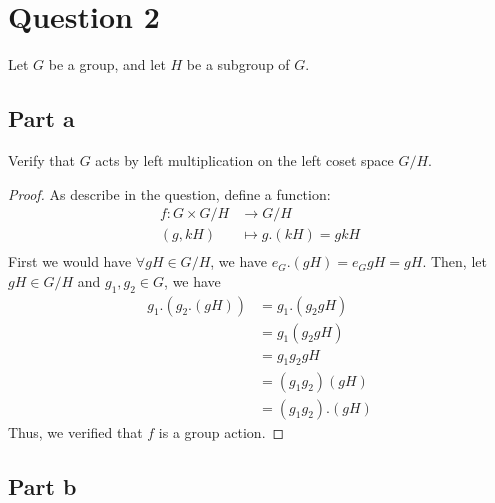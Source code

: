 \section{Question 2}

\begin{question}
    Let $G$ be a group, and let $H$ be a subgroup of $G$.
\end{question}

\subsection{Part a}

\begin{question}
    Verify that $G$ acts by left multiplication on the left coset space $G / H$.
\end{question}

\begin{answer}
    \begin{proof}
        As describe in the question, define a function:
        \begin{equation}
            \begin{aligned}
                f: G \times G/H &\to G/H\\
                (g,kH) &\mapsto g.(kH) = gkH\\
            \end{aligned}
        \end{equation}
        First we would have $\forall gH \in G/H$, we have $e_G.(gH) = e_GgH = gH$. Then, let $gH \in G/H$ and $g_1,g_2 \in G$, we have 
        \begin{equation}
            \begin{aligned}
                g_1.(g_2.(gH)) &= g_1.(g_2gH)\\
                &= g_1(g_2gH)\\
                &= g_1g_2gH\\
                &= (g_1g_2)(gH)\\
                &= (g_1g_2).(gH)
            \end{aligned}
        \end{equation}
        Thus, we verified that $f$ is a group action.
    \end{proof}
\end{answer}

\subsection{Part b}

